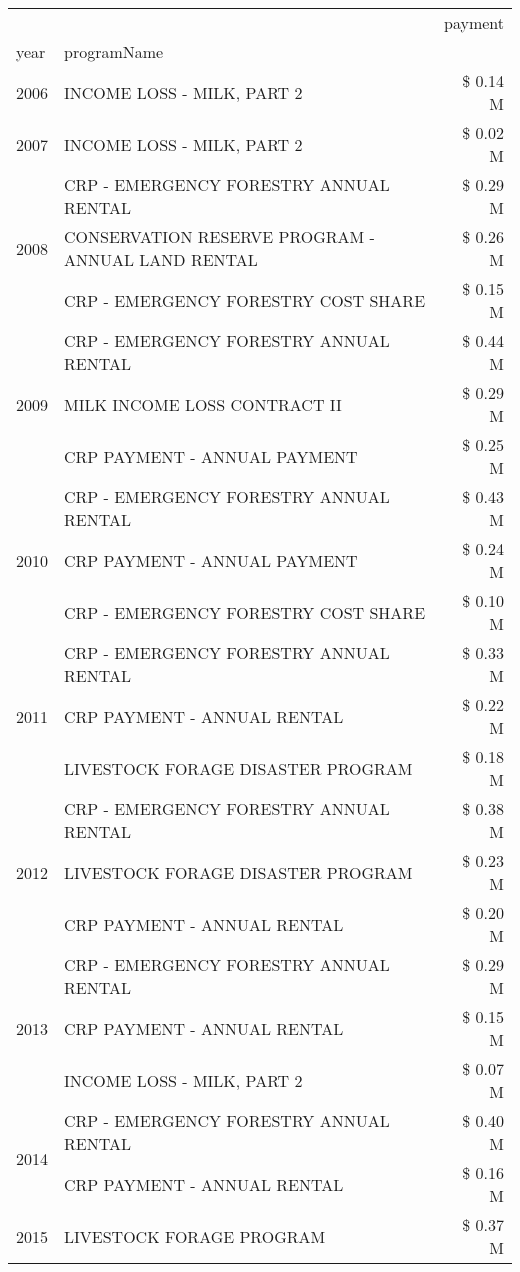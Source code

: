 \begin{tabular}{llr}
\toprule
 &  & payment \\
year & programName &  \\
\midrule
2006 & INCOME LOSS - MILK, PART 2 & \$ 0.14 M \\
\cline{1-3}
2007 & INCOME LOSS - MILK, PART 2 & \$ 0.02 M \\
\cline{1-3}
\multirow[t]{3}{*}{2008} & CRP - EMERGENCY FORESTRY ANNUAL RENTAL & \$ 0.29 M \\
 & CONSERVATION RESERVE PROGRAM - ANNUAL LAND RENTAL & \$ 0.26 M \\
 & CRP - EMERGENCY FORESTRY COST SHARE & \$ 0.15 M \\
\cline{1-3}
\multirow[t]{3}{*}{2009} & CRP - EMERGENCY FORESTRY ANNUAL RENTAL & \$ 0.44 M \\
 & MILK INCOME LOSS CONTRACT II & \$ 0.29 M \\
 & CRP PAYMENT - ANNUAL PAYMENT & \$ 0.25 M \\
\cline{1-3}
\multirow[t]{3}{*}{2010} & CRP - EMERGENCY FORESTRY ANNUAL RENTAL & \$ 0.43 M \\
 & CRP PAYMENT - ANNUAL PAYMENT & \$ 0.24 M \\
 & CRP - EMERGENCY FORESTRY COST SHARE & \$ 0.10 M \\
\cline{1-3}
\multirow[t]{3}{*}{2011} & CRP - EMERGENCY FORESTRY ANNUAL RENTAL & \$ 0.33 M \\
 & CRP PAYMENT - ANNUAL RENTAL & \$ 0.22 M \\
 & LIVESTOCK FORAGE DISASTER PROGRAM & \$ 0.18 M \\
\cline{1-3}
\multirow[t]{3}{*}{2012} & CRP - EMERGENCY FORESTRY ANNUAL RENTAL & \$ 0.38 M \\
 & LIVESTOCK FORAGE DISASTER PROGRAM & \$ 0.23 M \\
 & CRP PAYMENT - ANNUAL RENTAL & \$ 0.20 M \\
\cline{1-3}
\multirow[t]{3}{*}{2013} & CRP - EMERGENCY FORESTRY ANNUAL RENTAL & \$ 0.29 M \\
 & CRP PAYMENT - ANNUAL RENTAL & \$ 0.15 M \\
 & INCOME LOSS - MILK, PART 2 & \$ 0.07 M \\
\cline{1-3}
\multirow[t]{2}{*}{2014} & CRP - EMERGENCY FORESTRY ANNUAL RENTAL & \$ 0.40 M \\
 & CRP PAYMENT - ANNUAL RENTAL & \$ 0.16 M \\
\cline{1-3}
\multirow[t]{3}{*}{2015} & LIVESTOCK FORAGE PROGRAM & \$ 0.37 M \\

\end{tabular}
